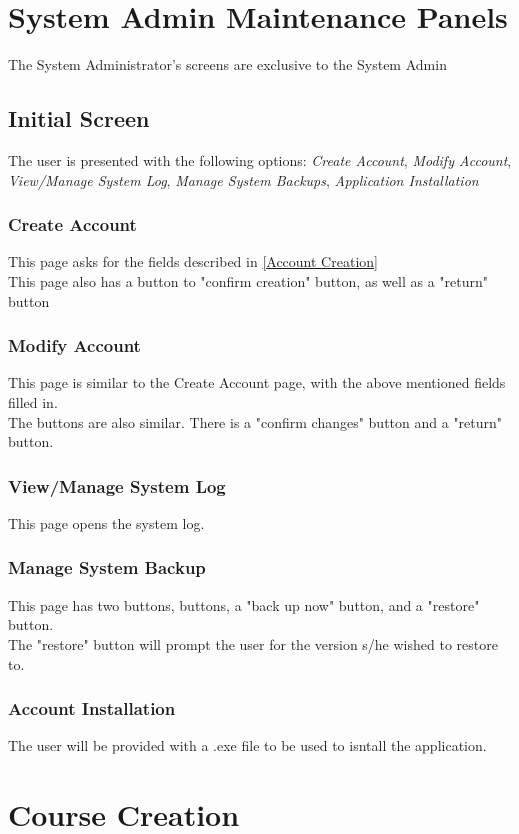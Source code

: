 \documentclass{article}
\begin{document}
\section{System Admin Maintenance Panels}
The System Administrator's screens are exclusive to the System Admin
\subsection{Initial Screen}
The user is presented with the following options: 
\emph{Create Account}, \emph{Modify Account}, \emph{View/Manage System Log}, \emph{Manage System Backups}, \emph{Application Installation}
\subsubsection{Create Account}
This page asks for the fields described in \ref{Account Creation} \\
This page also has a button to "confirm creation" button, as well as a "return" button
\subsubsection{Modify Account}
This page is similar to the Create Account page, with the above mentioned fields filled in. \\
The buttons are also similar. There is a "confirm changes" button and a "return" button.
\subsubsection{View/Manage System Log}
This page opens the system log. 
\subsubsection{Manage System Backup}
This page has two buttons, buttons, a "back up now" button, and a "restore" button. \\
The "restore" button will prompt the user for the version s/he wished to restore to.
\subsubsection{Account Installation}
The user will be provided with a .exe file to be used to isntall the application.

\section{Course Creation}
\end{document}
